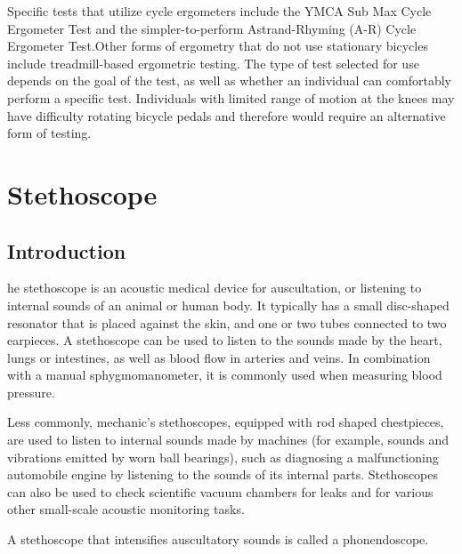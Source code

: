 \documentclass[12pt]{article}
\begin{document}
Specific tests that utilize cycle ergometers include the YMCA Sub Max Cycle Ergometer Test and the simpler-to-perform Astrand-Rhyming (A-R) Cycle Ergometer Test.Other forms of ergometry that do not use stationary bicycles include treadmill-based ergometric testing. The type of test selected for use depends on the goal of the test, as well as whether an individual can comfortably perform a specific test. Individuals with limited range of motion at the knees may have difficulty rotating bicycle pedals and therefore would require an alternative form of testing.
\section{Stethoscope}
\subsection{Introduction}
he stethoscope is an acoustic medical device for auscultation, or listening to internal sounds of an animal or human body. It typically has a small disc-shaped resonator that is placed against the skin, and one or two tubes connected to two earpieces. A stethoscope can be used to listen to the sounds made by the heart, lungs or intestines, as well as blood flow in arteries and veins. In combination with a manual sphygmomanometer, it is commonly used when measuring blood pressure.

Less commonly, mechanic's stethoscopes, equipped with rod shaped chestpieces, are used to listen to internal sounds made by machines (for example, sounds and vibrations emitted by worn ball bearings), such as diagnosing a malfunctioning automobile engine by listening to the sounds of its internal parts. Stethoscopes can also be used to check scientific vacuum chambers for leaks and for various other small-scale acoustic monitoring tasks.

A stethoscope that intensifies auscultatory sounds is called a phonendoscope.
\end{document}
